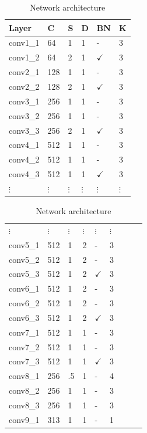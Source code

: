 \documentclass{article}
\begin{document}
\begin{table}
  \centering
  \caption{Network architecture}
  \label{tbl:arch}
\begin{minipage}[t]{.4\textwidth}
  \vspace{10pt}
  \begin{tabular}{llllll}
    \toprule
    Layer     & C   & S & D & BN & K\\
    \midrule
    \midrule
    conv1\_1  & 64  & 1  & 1 & - & 3 \\
    conv1\_2  & 64  & 2  & 1 & $\checkmark$ & 3 \\
    \midrule
    conv2\_1  & 128 & 1  & 1 & - & 3 \\
    conv2\_2  & 128 & 2  & 1 & $\checkmark$ & 3 \\
    \midrule
    conv3\_1  & 256 & 1  & 1 & -            & 3 \\
    conv3\_2  & 256 & 1  & 1 & -            & 3 \\
    conv3\_3  & 256 & 2  & 1 & $\checkmark$ & 3 \\
    \midrule
    conv4\_1  & 512 & 1  & 1 & -            & 3 \\
    conv4\_2  & 512 & 1  & 1 & -            & 3 \\
    conv4\_3  & 512 & 1  & 1 & $\checkmark$ & 3 \\
    \midrule
    $\vdots$ & $\vdots$ & $\vdots$ & $\vdots$ & $\vdots$ & $\vdots$
  \end{tabular}
\end{minipage}%
\begin{minipage}[t]{.4\textwidth}
  \vspace{0pt}
  \begin{tabular}{lllllllll}
    $\vdots$ & $\vdots$ & $\vdots$ & $\vdots$ & $\vdots$ & $\vdots$ \\
    conv5\_1  & 512 & 1  & 2 & -            & 3 \\
    conv5\_2  & 512 & 1  & 2 & -            & 3 \\
    conv5\_3  & 512 & 1  & 2 & $\checkmark$ & 3 \\
    \midrule
    conv6\_1  & 512 & 1  & 2 & -            & 3 \\
    conv6\_2  & 512 & 1  & 2 & -            & 3 \\
    conv6\_3  & 512 & 1  & 2 & $\checkmark$ & 3 \\
    \midrule
    conv7\_1  & 512 & 1  & 1 & -            & 3 \\
    conv7\_2  & 512 & 1  & 1 & -            & 3 \\
    conv7\_3  & 512 & 1  & 1 & $\checkmark$ & 3 \\
    \midrule
    conv8\_1  & 256 & .5 & 1 & -            & 4 \\
    conv8\_2  & 256 & 1  & 1 & -            & 3 \\
    conv8\_3  & 256 & 1  & 1 & -            & 3 \\
    \midrule
    conv9\_1  & 313 & 1  & 1 & -             & 1 \\
    \bottomrule
  \end{tabular}
\end{minipage}
\end{table}
\end{document}
